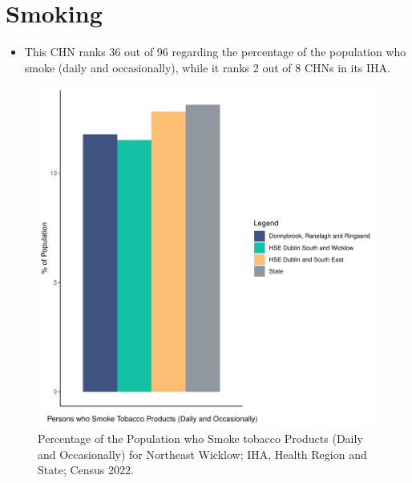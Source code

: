 \documentclass{article}
\begin{document}
\pagebreak

\section{Smoking}\label{sect:Smoking}
\begin{itemize}
\item This CHN ranks  36 out of 96 regarding the percentage of the population who smoke (daily and occasionally), while it ranks   2 out of 8 CHNs in its IHA.
\end{itemize}
\begin{figure}[H]
	\centering
	\includegraphics[width = 120mm]{../figures/SmokingED.pdf}
	\caption{Percentage of the Population who Smoke tobacco Products (Daily and Occasionally) for Northeast Wicklow; IHA, Health Region and State; Census 2022.}
	\label{fig:2ae19629-1a6a-13a3-e055-000000000001}
	\end{figure}
	
\end{document}
